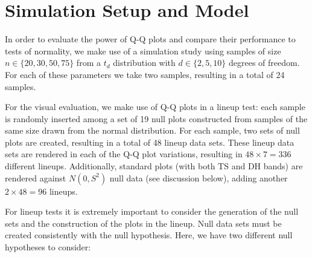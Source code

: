 \documentclass[12pt]{article}\usepackage[]{graphicx}\usepackage[]{color}
\newcommand{\alnote}[1]{\todo[inline,color=green!40]{#1}}
\begin{document}

\section{Simulation Setup and Model}\label{sec:simu}

In order to evaluate the power of Q-Q plots and compare their performance to tests of normality, we make use of a simulation study 
using samples of size $n \in \{20, 30, 50, 75\}$ from a $t_{d}$ distribution with $d \in \{2, 5, 10\}$ degrees of freedom. For each of these parameters we take two samples, resulting in a total of 24 samples.

For the visual evaluation, we make use of Q-Q plots in a lineup test: each sample is randomly inserted among a set of 19 null plots constructed from samples of the same size drawn from the normal distribution. For each  sample, two sets of null plots are created, resulting in a total of 48 lineup data sets. 
These lineup data sets are rendered in each of the Q-Q plot variations, resulting in $48 \times 7 = 336$ different lineups.  Additionally, standard plots (with both TS and DH bands) are rendered against $N(0, S^2)$ null data (see discussion below), adding another $2 \times 48 = 96$ lineups.




For lineup tests it is extremely important to consider the generation of the null sets and the construction of the plots in the lineup. 
Null data sets must be created consistently with the null hypothesis. Here, we have two different null hypotheses to consider:
\end{document}
